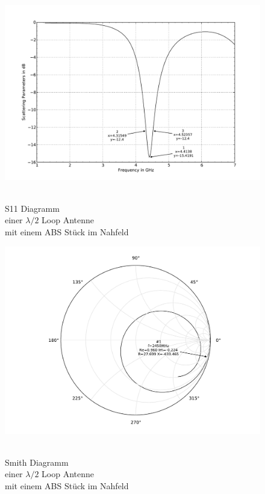 \begin{figure}[!h]
\begin{center}
  \includegraphics[width=\linewidth]{content/bilder/Evaluation/Loop/L2/1ABS/S11_Loop_Lambda2_mitABS.pdf}
  \caption{\\S11 Diagramm \\einer $\lambda/2$ Loop Antenne \\mit einem ABS Stück im Nahfeld}\label{fig:S11_Lambda2_Loop_1ABS_3}
\endminipage%
{}
  \includegraphics[width=\linewidth]{content/bilder/Evaluation/Loop/L2/1ABS/Smith_Loop_Lambda2_mitABS.pdf}
  \caption{\\Smith Diagramm \\einer $\lambda/2$ Loop Antenne \\ mit einem ABS Stück im Nahfeld}\label{fig:Smith_Lambda2_Loop_1ABS_4}
\endminipage
\end{center}
\end{figure}

